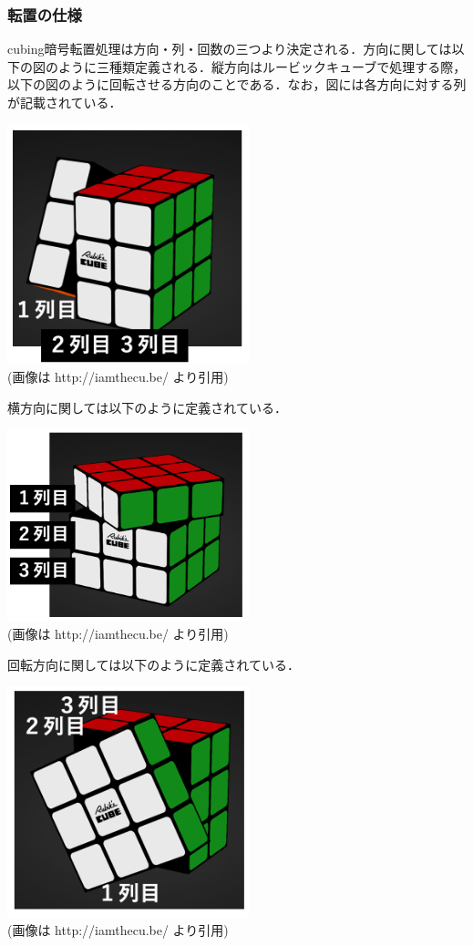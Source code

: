 \documentclass{jsarticle}
\begin{document}
\subsubsection{転置の仕様}
cubing暗号転置処理は方向・列・回数の三つより決定される．方向に関しては以下の図のように三種類定義される．縦方向はルービックキューブで処理する際，以下の図のように回転させる方向のことである．なお，図には各方向に対する列が記載されている．
\begin{center}
  \includegraphics[width=7cm]{./tex_pic/tate.jpg}\\
(画像は http://iamthecu.be/ より引用)\\
\end{center}
横方向に関しては以下のように定義されている．
\begin{center}
  \includegraphics[width=7cm]{./tex_pic/yoko.jpg}\\
(画像は http://iamthecu.be/ より引用)\\
\end{center}
回転方向に関しては以下のように定義されている．
\begin{center}
  \includegraphics[width=7cm]{./tex_pic/kai.jpg}\\
(画像は http://iamthecu.be/ より引用)\\
\end{center}
\end{document}
